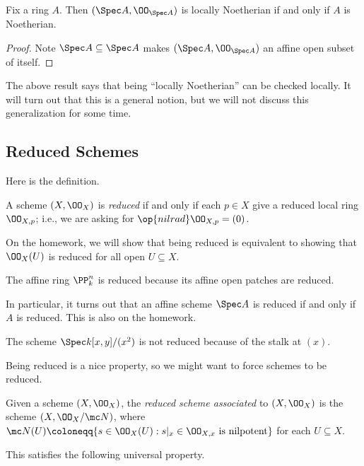 \documentclass[../notes.tex]{subfiles}
\begin{document}
\begin{cor}
	Fix a ring $A$. Then $(\Spec A,\OO_{\Spec A})$ is locally Noetherian if and only if $A$ is Noetherian.
\end{cor}
\begin{proof}
	Note $\Spec A\subseteq\Spec A$ makes $(\Spec A,\OO_{\Spec A})$ an affine open subset of itself.
\end{proof}
\begin{remark}
	The above result says that being ``locally Noetherian'' can be checked locally. It will turn out that this is a general notion, but we will not discuss this generalization for some time.
\end{remark}

\subsection{Reduced Schemes}
Here is the definition.
\begin{definition}[Reduced]
	A scheme $(X,\OO_X)$ is \textit{reduced} if and only if each $p\in X$ give a reduced local ring $\OO_{X,p}$; i.e., we are asking for $\op{nilrad}\OO_{X,p}=(0)$.
\end{definition}
\begin{remark}
	On the homework, we will show that being reduced is equivalent to showing that $\OO_X(U)$ is reduced for all open $U\subseteq X$.
\end{remark}
\begin{example}
	The affine ring $\PP^n_k$ is reduced because its affine open patches are reduced.
\end{example}
\begin{remark}
	In particular, it turns out that an affine scheme $\Spec A$ is reduced if and only if $A$ is reduced. This is also on the homework.
\end{remark}
\begin{nex}
	The scheme $\Spec k[x,y]/(x^2)$ is not reduced because of the stalk at $(x)$.
\end{nex}
Being reduced is a nice property, so we might want to force schemes to be reduced.
\begin{definition}
	Given a scheme $(X,\OO_X)$, the \textit{reduced scheme associated} to $(X,\OO_X)$ is the scheme $(X,\OO_X/\mc N)$, where $\mc N(U)\coloneqq\{s\in\OO_X(U):s|_x\in\OO_{X,x}\text{ is nilpotent}\}$ for each $U\subseteq X$.
\end{definition}
This satisfies the following universal property.
\end{document}
